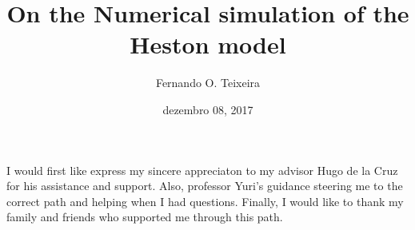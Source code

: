 \documentclass[12pt,oneside]{reedthesis}
\title{\textbf{\Huge{On the Numerical simulation of the \\[20pt] Heston model}}}
\author{Fernando O. Teixeira}
\date{dezembro 08, 2017}
\theoremstyle{definition}
\theoremstyle{definition}
\theoremstyle{remark}
\begin{document}
      \maketitle
  
  \frontmatter %
  \pagestyle{empty} %
      \begin{acknowledgements}
      I would first like express my sincere appreciaton to my advisor Hugo de
      la Cruz for his assistance and support. Also, professor Yuri's guidance
      steering me to the correct path and helping when I had questions.
      Finally, I would like to thank my family and friends who supported me
      through this path.
      \textbf{\\ \\ \\ \\ \\ \\ \\ \\ \\ \\ \\ \\ \\ \\ \\ \\ \\ \\ \\ \\ \\ \\ \\ \\ \\ \\ \\ \\ \\ \\ \\ \\ \\ \\ \\ \\ \\ \\ \\ \\ \\ \\ \\ \\ \\ \\ \\ \\ \\ \\ \\ \\ \\ \\ \\ \\ \\ \\ \\ \\ \\ \\ \\ }
\end{acknowledgements}
\end{document}
